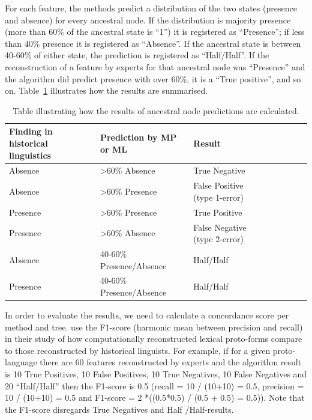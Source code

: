 \documentclass[a4paper,10pt]{article} %
\begin{document}
For each feature, the methods predict a distribution of the two states (presence and absence) for every ancestral node. If the distribution is majority presence (more than 60\% of the ancestral state is ``1'') it is registered as ``Presence''; if less than 40\% presence it is registered as ``Absence''. If the ancestral state is between 40-60\% of either state, the prediction is registered as ``Half/Half''. If the reconstruction of a feature by experts for that ancestral node was ``Presence'' and the algorithm did predict presence with over 60\%, it is a ``True positive'', and so on. Table~\ref{example_HL_prediction_table_true_positives} illustrates how the results are summarised.

\begin{table}[H]
\centering
\caption{Table illustrating how the results of ancestral node predictions are calculated.}
\label{example_HL_prediction_table_true_positives}
\begin{tabular}{|l|l|l|l|l|l|l|l|}
\hline
\textbf{Finding in historical linguistics} & \textbf{Prediction by MP or ML} & \textbf{Result} \\ \hline
Absence & >60\% Absence & True Negative \\ \hline
Absence & >60\% Presence & False Positive (type 1-error) \\ \hline
Presence & >60\% Presence & True Positive \\ \hline
Presence & >60\% Absence & False Negative (type 2-error) \\ \hline
Absence & 40-60\% Presence/Absence & Half/Half \\ \hline
Presence & 40-60\% Presence/Absence & Half/Half\\ \hline
\end{tabular}
\end{table}

In order to evaluate the results, we need to calculate a concordance score per method and tree. \citet{jager2018using} use the F1-score (harmonic mean between precision and recall) in their study of how computationally reconstructed lexical proto-forms compare to those reconstructed by historical linguists.  For example, if for a given proto-language there are 60 features reconstructed by experts and the algorithm result is 10 True Positives, 10 False Positives, 10 True Negatives, 10 False Negatives and 20 ``Half/Half'' then the F1-score is 0.5 (recall = 10 / (10+10) = 0.5, precision = 10 / (10+10) = 0.5 and F1-score = 2 *((0.5*0.5) / (0.5 + 0.5) = 0.5)). Note that the F1-score disregards True Negatives and Half /Half-results.
\end{document}
